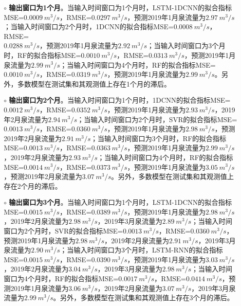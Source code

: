\begin{enumerate}
  \begin{itemize}
    \item[$\circ$] \textbf{输出窗口为1个月}。当输入时间窗口为1个月时，LSTM-1DCNN的拟合指标MSE=$\SI{0.0009}{m^{3}/s}$，RMSE=$\SI{0.0297}{m^{3}/s}$，预测2019年1月泉流量为$\SI{2.97}{m^{3}/s}$；当输入时间窗口为2个月时，1DCNN的拟合指标MSE=$\SI{0.0008}{m^{3}/s}$，RMSE=\\$\SI{0.0288}{m^{3}/s}$，预测2019年1月泉流量为$\SI{2.92}{m^{3}/s}$；当输入时间窗口为3个月时，RF的拟合指标MSE=$\SI{0.0010}{m^{3}/s}$，RMSE=$\SI{0.0313}{m^{3}/s}$，预测2019年1月泉流量为$\SI{2.99}{m^{3}/s}$；当输入时间窗口为4个月时，RF的拟合指标MSE=$\SI{0.0010}{m^{3}/s}$，RMSE=$\SI{0.0319}{m^{3}/s}$，预测2019年1月泉流量为$\SI{2.99}{m^{3}/s}$。另外，多数模型在测试集和其观测值上存在1个月的滞后。
    \item[$\circ$] \textbf{输出窗口为2个月}。当输入时间窗口为1个月时，1DCNN的拟合指标MSE=\\$\SI{0.0012}{m^{3}/s}$，RMSE=$\SI{0.0352}{m^{3}/s}$，预测2019年1月泉流量为$\SI{2.93}{m^{3}/s}$，2019年2月泉流量为$\SI{2.94}{m^{3}/s}$；当输入时间窗口为2个月时，SVR的拟合指标MSE=\\$\SI{0.0013}{m^{3}/s}$，RMSE=$\SI{0.0360}{m^{3}/s}$，预测2019年1月泉流量为$\SI{2.98}{m^{3}/s}$，预测2019年2月泉流量为$\SI{2.91}{m^{3}/s}$；当输入时间窗口为3个月时，RF的拟合指标MSE=$\SI{0.0013}{m^{3}/s}$，RMSE=$\SI{0.0363}{m^{3}/s}$，预测2019年1月泉流量为$\SI{2.99}{m^{3}/s}$，2019年2月泉流量为$\SI{2.93}{m^{3}/s}$；当输入时间窗口为4个月时，RF的拟合指标MSE=$\SI{0.0014}{m^{3}/s}$，RMSE=$\SI{0.0373}{m^{3}/s}$，预测2019年1月泉流量为$\SI{3.05}{m^{3}/s}$，预测2019年2月泉流量为$\SI{3.07}{m^{3}/s}$。另外，多数模型在测试集和其观测值上存在2个月的滞后。
    \item[$\circ$] \textbf{输出窗口为3个月}。当输入时间窗口为1个月时，LSTM-1DCNN的拟合指标MSE=$\SI{0.0015}{m^{3}/s}$，RMSE=$\SI{0.0389}{m^{3}/s}$，预测2019年1月泉流量为$\SI{2.98}{m^{3}/s}$，2019年2月泉流量为$\SI{2.98}{m^{3}/s}$，2019年3月泉流量为$\SI{2.89}{m^{3}/s}$；当输入时间窗口为2个月时，SVR的拟合指标MSE=$\SI{0.0013}{m^{3}/s}$，RMSE=$\SI{0.0360}{m^{3}/s}$，预测2019年1月泉流量为$\SI{2.98}{m^{3}/s}$，2019年2月泉流量为$\SI{2.91}{m^{3}/s}$，2019年3月泉流量为$\SI{2.90}{m^{3}/s}$；当输入时间窗口为3个月时，LSTM-RNN的拟合指标MSE=$\SI{0.0015}{m^{3}/s}$，RMSE=$\SI{0.0390}{m^{3}/s}$，预测2019年1月泉流量为$\SI{3.03}{m^{3}/s}$，2019年2月泉流量为$\SI{3.04}{m^{3}/s}$，2019年3月泉流量为$\SI{2.98}{m^{3}/s}$；当输入时间窗口为4个月时，RF的拟合指标MSE=$\SI{0.0017}{m^{3}/s}$，RMSE=$\SI{0.0414}{m^{3}/s}$，预测2019年1月泉流量为$\SI{3.06}{m^{3}/s}$，2019年2月泉流量为$\SI{3.07}{m^{3}/s}$，2019年3月泉流量为$\SI{2.99}{m^{3}/s}$。另外，多数模型在测试集和其观测值上存在3个月的滞后。

\end{itemize}
\end{enumerate}
